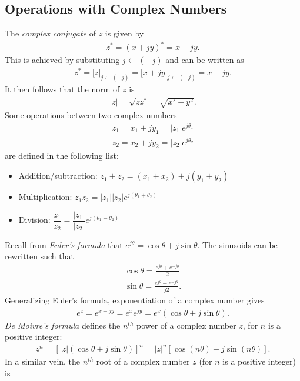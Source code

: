 \documentclass{report}
\begin{document}
\subsection*{Operations with Complex Numbers}
The \emph{complex conjugate} of $z$ is given by 
\begin{align}
    z^* = (x+jy)^* = x-jy.
\end{align}
This is achieved by substituting $j\leftarrow (-j)$ and can be written as 
\begin{align}
    z^* = \big[z\big|_{j\leftarrow (-j)} = \big[x+jy\big|_{j\leftarrow (-j)} = x-jy.
\end{align}
It then follows that the norm of $z$ is
\begin{align}
    |z| = \sqrt{zz^*} = \sqrt{x^2+y^2}.
\end{align}
Some operations between two complex numbers 
\begin{align*}
    z_1=x_1+jy_1=|z_1|e^{j\theta_1} \\
    z_2=x_2+jy_2=|z_2|e^{j\theta_2}
\end{align*}
are defined in the following list:
\begin{itemize}
    \item Addition/subtraction: $z_1 \pm z_2=(x_1\pm x_2) + j(y_1\pm y_2)$
    \item Multiplication: $z_1z_2=|z_1||z_2|e^{j(\theta_1+\theta_2)}$
    \item Division: $\dfrac{z_1}{z_2}=\dfrac{|z_1|}{|z_2|}e^{j(\theta_1-\theta_2)}$
\end{itemize}
Recall from \emph{Euler's formula} that $e^{j\theta} = \cos\theta + j\sin\theta$. The sinusoids can be rewritten such that
\begin{align}
    \cos\theta = \frac{e^{j\theta}+e^{-j\theta}}{2} \\
    \sin\theta = \frac{e^{j\theta}-e^{-j\theta}}{j2}.
\end{align}
Generalizing Euler's formula, exponentiation of a complex number gives
\begin{align}
    e^z = e^{x+jy} = e^x e^{jy} = e^x(\cos\theta +j\sin\theta).
\end{align}
\emph{De Moivre's formula} defines the $n^{th}$ power of a complex number $z$, for $n$ is a positive integer:
\begin{align}
    z^n = [|z|(\cos\theta + j\sin\theta)]^n = |z|^n[\cos(n\theta)+j\sin(n\theta)].
\end{align}
In a similar vein, the $n^{th}$ root of a complex number $z$ (for $n$ is a positive integer) is
\end{document}
